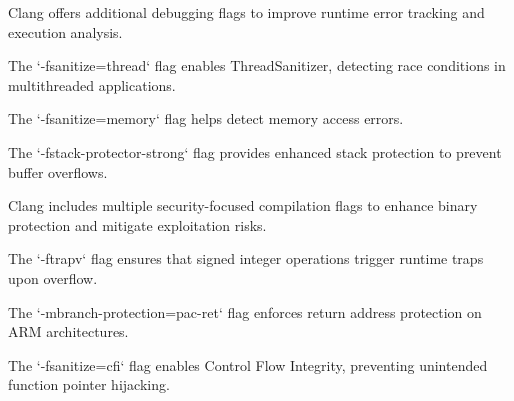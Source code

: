 \begin{NxSSSSBox}
	\begin{NxIDBox}
		Clang offers additional debugging flags to improve runtime error tracking and execution analysis.
	\end{NxIDBox}
	\begin{NxIDBox}
		The `-fsanitize=thread` flag enables ThreadSanitizer, detecting race conditions in multithreaded applications.
	\end{NxIDBox}
	\begin{NxIDBox}
		The `-fsanitize=memory` flag helps detect memory access errors.
	\end{NxIDBox}
	\begin{NxIDBox}
		The `-fstack-protector-strong` flag provides enhanced stack protection to prevent buffer overflows.
	\end{NxIDBox}
\end{NxSSSSBox}

\begin{NxSSSSBox}
	\begin{NxIDBox}
		Clang includes multiple security-focused compilation flags to enhance binary protection and mitigate exploitation risks.
	\end{NxIDBox}
	\begin{NxIDBox}
		The `-ftrapv` flag ensures that signed integer operations trigger runtime traps upon overflow.
	\end{NxIDBox}
	\begin{NxIDBox}
		The `-mbranch-protection=pac-ret` flag enforces return address protection on ARM architectures.
	\end{NxIDBox}
	\begin{NxIDBox}
		The `-fsanitize=cfi` flag enables Control Flow Integrity, preventing unintended function pointer hijacking.
	\end{NxIDBox}
\end{NxSSSSBox}

